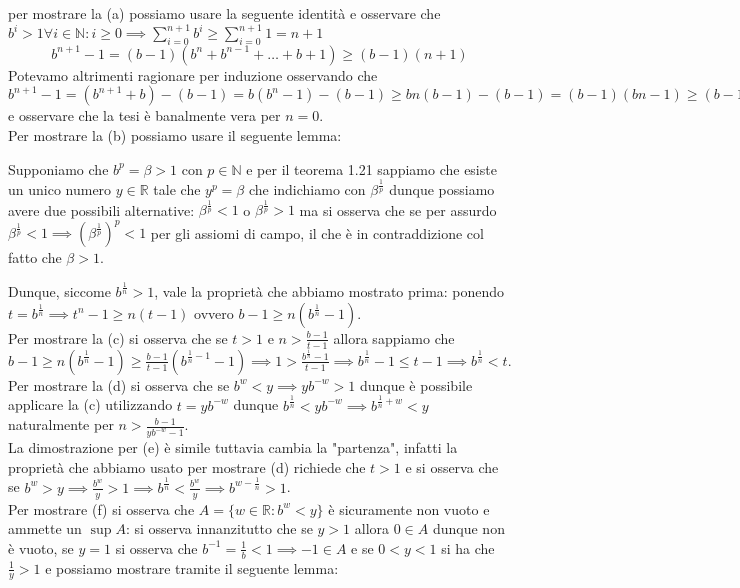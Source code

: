 \documentclass{report}
\begin{document}
\begin{mysolution}
per mostrare la (a) possiamo usare la seguente identità e osservare che $b^i > 1 \forall i \in \mathbb{N}: i \geq 0 \implies \sum\limits_{i=0}^{n+1} b^i \geq \sum\limits_{i=0}^{n+1} 1 = n+1$
$$
b^{n+1} - 1 = (b-1)(b^n + b^{n-1} + \ldots + b + 1) \geq (b-1)(n+1)
$$
Potevamo altrimenti ragionare per induzione osservando che $b^{n+1} - 1 = (b^{n+1} + b) - (b - 1) = b(b^n - 1) - (b-1) \geq bn(b-1) - (b-1) = (b-1)(bn - 1) \geq (b-1)(n+1)$ e osservare che la tesi è banalmente vera per $n=0$. \\
Per mostrare la (b) possiamo usare il seguente lemma:
\begin{myproof} Supponiamo che $b^p = \beta > 1$ con $p \in \mathbb{N}$ e per il teorema 1.21 sappiamo che esiste un unico numero $y \in \mathbb{R}$ tale che $y^p = \beta$ che indichiamo con $\beta^{\frac{1}{p}}$ dunque possiamo avere due possibili alternative: $\beta^{\frac{1}{p}} < 1$ o $\beta^{\frac{1}{p}} > 1$ ma si osserva che se per assurdo $\beta^{\frac{1}{p}} < 1 \implies (\beta^{\frac{1}{p}})^p < 1$ per gli assiomi di campo, il che è in contraddizione col fatto che $\beta > 1$.
\end{myproof}
\noindent Dunque, siccome $b^{\frac{1}{n}} > 1$, vale la proprietà che abbiamo mostrato prima: ponendo $t=b^{\frac{1}{n}} \implies t^n - 1 \geq n(t-1)$ ovvero $b-1 \geq n(b^{\frac{1}{n}} - 1)$. \\
Per mostrare la (c) si osserva che se $t > 1$ e $n > \frac{b-1}{t-1}$ allora sappiamo che $b-1 \geq n(b^\frac{1}{n} - 1) \geq \frac{b-1}{t-1} (b^{\frac{1}{n}-1} - 1) \implies 1 > \frac{b^{\frac{1}{n}}-1}{t-1} \implies b^{\frac{1}{n}}-1 \leq t-1 \implies b^{\frac{1}{n}}<t$. \\
Per mostrare la (d) si osserva che se $b^w < y \implies yb^{-w} > 1$ dunque è possibile applicare la (c) utilizzando $t=yb^{-w}$ dunque $b^{\frac{1}{n}} < yb^{-w} \implies b^{\frac{1}{n}+w} < y$ naturalmente per $n > \frac{b-1}{yb^{-w}-1}$. \\
La dimostrazione per (e) è simile tuttavia cambia la "partenza", infatti la proprietà che abbiamo usato per mostrare (d) richiede che $t > 1$ e si osserva che se $b^w > y \implies \frac{b^w}{y} > 1 \implies b^{\frac{1}{n}} < \frac{b^w}{y} \implies b^{w-\frac{1}{n}} > 1$. \\ Per mostrare (f) si osserva che $A = \{w \in \mathbb{R} : b^w < y \}$ è sicuramente non vuoto e ammette un $\sup{A}$: si osserva innanzitutto che se $y>1$ allora $0 \in A$ dunque non è vuoto, se $y=1$ si osserva che $b^{-1} = \frac{1}{b} < 1 \implies -1 \in A$ e se $0 < y < 1 $ si ha che $\frac{1}{y} > 1$ e possiamo mostrare tramite il seguente lemma:

\end{mysolution}
\end{document}
